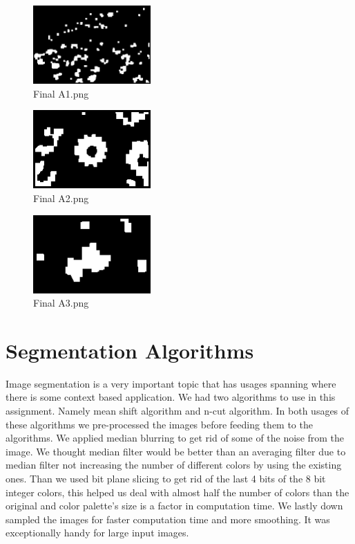 \documentclass[conference]{IEEEtran}
\begin{document}
    \begin{figure}[h]
        \centering
        \includegraphics[width=0.4\textwidth]{resources/A1.png}
        \caption{Final A1.png}
        \label{fig:a1_output}
    \end{figure}
    \begin{figure}[h]
        \centering
        \includegraphics[width=0.4\textwidth]{resources/A2.png}
        \caption{Final A2.png}
        \label{fig:a2_output}
    \end{figure}
    \begin{figure}[h]
        \centering
        \includegraphics[width=0.4\textwidth]{resources/A3.png}
        \caption{Final A3.png}
        \label{fig:a3_output}
    \end{figure}

\section{Segmentation Algorithms}
Image segmentation is a very important topic that has usages spanning where there is some context based application. We had two algorithms to use in this assignment. Namely mean shift algorithm and n-cut algorithm. In both usages of these algorithms we pre-processed the images before feeding them to the algorithms. We applied median blurring to get rid of some of the noise from the image. We thought median filter would be better than an averaging filter due to median filter not increasing the number of different colors by using the existing ones. Than we used bit plane slicing to get rid of the last 4 bits of the 8 bit integer colors, this helped us deal with almost half the number of colors than the original and color palette's size is a factor in computation time. We lastly down sampled the images for faster computation time and more smoothing. It was exceptionally handy for large input images. 
\end{document}
